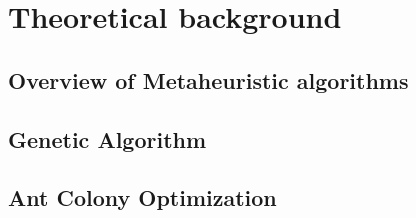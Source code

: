 \chapter{Theoretical background}
\label{chap:chap1}

\section{Overview of Metaheuristic algorithms}
\label{intro:overview}


\section{Genetic Algorithm}
\label{intro:ga}


\section{Ant Colony Optimization}
\label{intro:aco}
